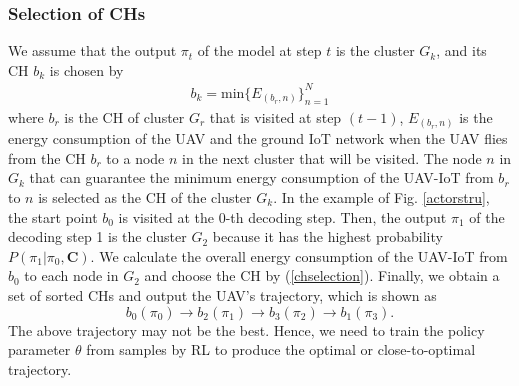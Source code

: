\documentclass[journal]{IEEEtran}
\begin{document}
	\subsubsection{Selection of CHs}
	We assume that the output $\pi_t$ of the model at step $t$ is the cluster $G_k$, and its CH $b_k$ is chosen by
	\begin{align}
	\label{chselection}
	    b_k = \text{min}\{E_{(b_r,n)}\}_{n=1}^{N}
	\end{align}
	where $b_r$ is the CH of cluster $G_r$ that is visited at step $(t-1)$, $E_{(b_r,n)}$ is the energy consumption of the UAV and the ground IoT network when the UAV flies from the CH $b_r$ to a node $n$ in the next cluster that will be visited. The node $n$ in $G_k$ that can guarantee the minimum energy consumption of the UAV-IoT from $b_r$ to $n$ is selected as the CH of the cluster $G_k$. In the example of Fig. \ref{actorstru}, the start point $b_0$ is visited at the $0$-th decoding step. Then, the output $\pi_1$ of the decoding step 1 is the cluster $G_2$ because it has the highest probability $P(\pi_1|\pi_0, \bm{C})$. We calculate the overall energy consumption of the UAV-IoT from $b_0$ to each node in $G_2$ and choose the CH by (\ref{chselection}).  Finally, we obtain a set of sorted CHs and output the UAV's trajectory, which is shown as
	\begin{equation*}
	    b_0(\pi_0)\xrightarrow{} b_2(\pi_1)\xrightarrow{} b_3(\pi_2)\xrightarrow{} b_1(\pi_3).
	\end{equation*}
	{The above trajectory may not be the best. Hence, we need to train the policy parameter $\theta$ from samples by RL to produce the optimal or close-to-optimal trajectory.}
	
\end{document}

